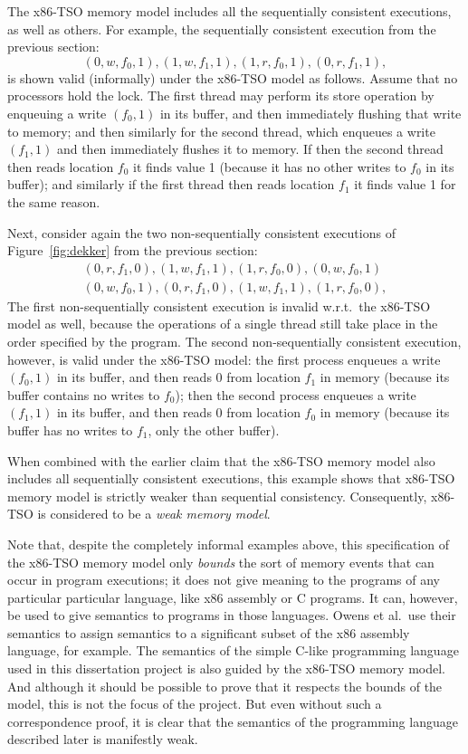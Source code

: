 \documentclass[11pt]{report}         %
\begin{document}
The x86-TSO memory model includes all the sequentially consistent executions, as well as others. For example, the sequentially consistent execution from the previous section: \[ (0,w,f_0,1), (1,w,f_1,1), (1,r,f_0,1), (0,r,f_1,1), \] is shown valid (informally) under the x86-TSO model as follows. Assume that no processors hold the lock. The first thread may perform its store operation by enqueuing a write $(f_0,1)$ in its buffer, and then immediately flushing that write to memory; and then similarly for the second thread, which enqueues a write $(f_1,1)$ and then immediately flushes it to memory. If then the second thread then reads location $f_0$ it finds value 1 (because it has no other writes to $f_0$ in its buffer); and similarly if the first thread then reads location $f_1$ it finds value 1 for the same reason. 

Next, consider again the two non-sequentially consistent executions of Figure~\ref{fig:dekker} from the previous section: \begin{align*}
  (0,r,f_1,0), (1,w,f_1,1), (1,r,f_0,0), (0,w,f_0,1) \\ 
  (0,w,f_0,1), (0,r,f_1,0), (1,w,f_1,1), (1,r,f_0,0), 
\end{align*} The first non-sequentially consistent execution is invalid w.r.t.\ the x86-TSO model as well, because the operations of a single thread still take place in the order specified by the program. The second non-sequentially consistent execution, however, is valid under the x86-TSO model: the first process enqueues a write $(f_0,1)$ in its buffer, and then reads $0$ from location $f_1$ in memory (because its buffer contains no writes to $f_0$); then the second process enqueues a write $(f_1,1)$ in its buffer, and then reads $0$ from location $f_0$ in memory (because its buffer has no writes to $f_1$, only the other buffer). 

When combined with the earlier claim that the x86-TSO memory model also includes all sequentially consistent executions, this example shows that x86-TSO memory model is strictly weaker than sequential consistency. Consequently, x86-TSO is considered to be a \emph{weak memory model}.

Note that, despite the completely informal examples above, this specification of the x86-TSO memory model only \emph{bounds} the sort of memory events that can occur in program executions; it does not give meaning to the programs of any particular particular language, like x86 assembly or C programs. It can, however, be used to give semantics to programs in those languages. Owens et al.\ use their semantics to assign semantics to a significant subset of the x86 assembly language, for example. The semantics of the simple C-like programming language used in this dissertation project is also guided by the x86-TSO memory model. And although it should be possible to prove that it respects the bounds of the model, this is not the focus of the project. But even without such a correspondence proof, it is clear that the semantics of the programming language described later is manifestly weak. 
\end{document}
